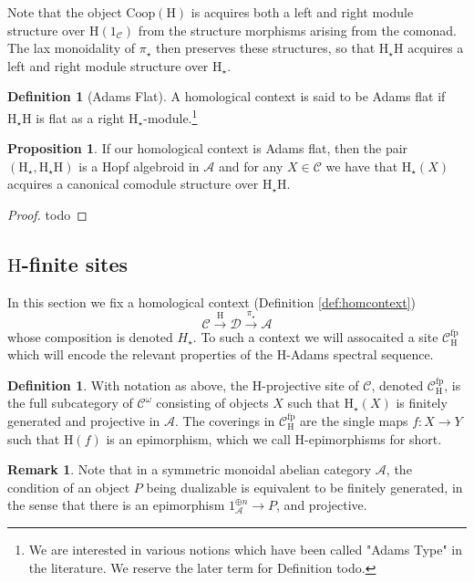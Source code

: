 \documentclass[10pt]{amsart}
\theoremstyle{definition}
\numberwithin{figure}{section}
\numberwithin{equation}{section}
\newtheorem{proposition}[figure]{Proposition}
\newtheorem{definition}[figure]{Definition}
\newtheorem{remark}[figure]{Remark}
\newcommand{\cA}{\mathcal{A}}
\newcommand{\cC}{\mathcal{C}}
\newcommand{\cD}{\mathcal{D}}
\newcommand{\one}{\mathrm{1}}
\theoremstyle{cited}
\newcommand{\fp}{\mathrm{fp}}
\renewcommand{\H}{\mathrm{H}}
\newcommand{\Coop}{\mathrm{Coop}}
\begin{document}
Note that the object $\Coop(\H)$ is acquires both a left and right module structure over $\H(\one_{\cC})$ from the structure morphisms arising from the comonad. The lax monoidality of $\pi_\star$ then preserves these structures, so that $\H_\star \H$ acquires a left and right module structure over $\H_\star$.

\begin{definition}[Adams Flat]
  A homological context is said to be Adams flat if $\H_\star \H$ is flat as a right $\H_\star$-module.\footnote{We are interested in various notions which have been called "Adams Type" in the literature. We reserve the later term for Definition {todo}.}
\end{definition}

\begin{proposition}
  If our homological context is Adams flat, then the pair $(\H_\star, \H_\star\H)$ is a Hopf algebroid in $\cA$ and for any $X\in \cC$ we have that $\H_\star(X)$ acquires a canonical comodule structure over $\H_\star \H$.
\end{proposition}

\begin{proof}
  todo
\end{proof}

\subsection{$\H$-finite sites}

In this section we fix a homological context (Definition \ref{def:homcontext})
\[
\cC\xrightarrow{\H} \cD \xrightarrow{\pi_\star} \cA
\]
whose composition is denoted $H_\star$. To such a context we will assocaited a site $\cC_{\H}^\fp$ which will encode the relevant properties of the $\H$-Adams spectral sequence.

\begin{definition}\label{def:projectivesite}
  With notation as above, the $\H$-projective site of $\cC$, denoted $\cC^{\fp}_{\H}$, is the full subcategory of $\cC^\omega$ consisting of objects $X$ such that $\H_{\star}(X)$ is finitely generated and projective in $\cA$. The coverings in $\cC^\fp_{\H}$ are the single maps $f:X\to Y$ such that $\H(f)$ is an epimorphism, which we call $\H$-epimorphisms for short.
\end{definition}

\begin{remark}
  Note that in a symmetric monoidal abelian category $\cA$, the condition of an object $P$ being dualizable is equivalent to be finitely generated, in the sense that there is an epimorphism $\one_{\cA}^{\oplus n}\to P$, and projective.
\end{remark}
\end{document}

